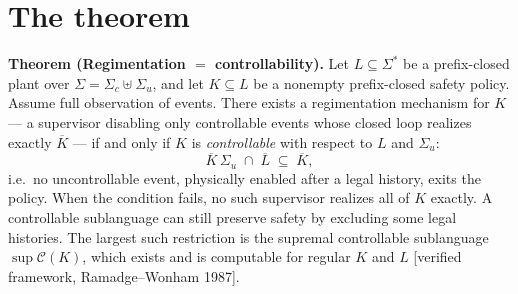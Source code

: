 \documentclass[11pt,a4paper]{article}  \usepackage{mdframed} \usepackage{graphicx} \usepackage{tabularx}
\begin{document}
\section{The theorem}\label{sec:theorem} \begin{thebox} \textbf{Theorem (Regimentation $=$ controllability).} Let
$L\subseteq\Sigma^*$ be a prefix-closed plant over $\Sigma=\Sigma_c\uplus\Sigma_u$, and let $K\subseteq L$ be a nonempty
prefix-closed safety policy. Assume full observation of events. There exists a regimentation mechanism for $K$ --- a supervisor disabling only controllable
events whose closed loop realizes exactly $\overline{K}$ --- if and only if $K$ is \emph{controllable} with respect to $L$
and $\Sigma_u$: \[ \overline{K}\,\Sigma_u\;\cap\;\overline{L}\;\subseteq\;\overline{K}, \] i.e.\ no uncontrollable event,
physically enabled after a legal history, exits the policy. When the condition fails, no such supervisor realizes all of $K$ exactly.
A controllable sublanguage can still preserve safety by excluding some legal
histories. The largest such restriction is the supremal controllable sublanguage $\sup\mathcal{C}(K)$, which exists and is computable for
regular $K$ and $L$ [verified framework, Ramadge--Wonham 1987]. \end{thebox}
\end{document}
